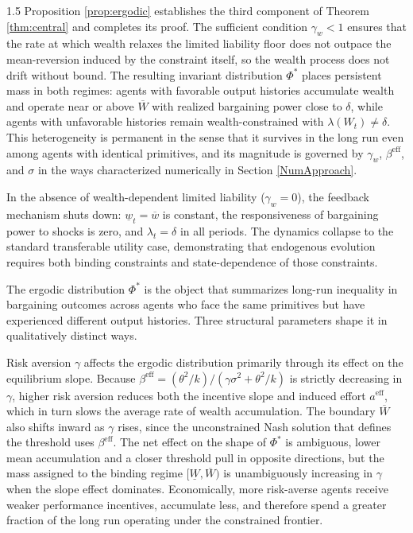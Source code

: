 \documentclass[12pt]{article}
\theoremstyle{definition}
\theoremstyle{plain}
\begin{document}
\begin{spacing}{1.5}
Proposition \ref{prop:ergodic} establishes the third component of Theorem \ref{thm:central} and completes its proof. The sufficient condition $\gamma_w < 1$ ensures that the rate at which wealth relaxes the limited liability floor does not outpace the mean-reversion induced by the constraint itself, so the wealth process does not drift without bound. The resulting invariant distribution $\Phi^*$ places persistent mass in both regimes: agents with favorable output histories accumulate wealth and operate near or above $\overline{W}$ with realized bargaining power close to $\delta$, while agents with unfavorable histories remain wealth-constrained with $\lambda(W_t) \neq \delta$. This heterogeneity is permanent in the sense that it survives in the long run even among agents with identical primitives, and its magnitude is governed by $\gamma_w$, $\beta^{\mathrm{eff}}$, and $\sigma$ in the ways characterized numerically in Section \ref{NumApproach}. 

In the absence of wealth-dependent limited liability ($\gamma_w = 0$), the feedback mechanism shuts down: $\underline{w}_t = \overline{w}$ is constant, the responsiveness of bargaining power to shocks is zero, and $\lambda_t = \delta$ in all periods. The dynamics collapse to the standard transferable utility case, demonstrating that endogenous evolution requires both binding constraints and state-dependence of those constraints.

The ergodic distribution $\Phi^*$ is the object that summarizes long-run inequality in bargaining outcomes across agents who face the same primitives but have experienced different output histories. Three structural parameters shape it in qualitatively distinct ways.
 
Risk aversion $\gamma$ affects the ergodic distribution primarily through its effect on the equilibrium slope. Because $\beta^{\mathrm{eff}} = (\theta^2/k)/(\gamma\sigma^2 + \theta^2/k)$ is strictly decreasing in $\gamma$, higher risk aversion reduces both the incentive slope and induced effort $a^{\mathrm{eff}}$, which in turn slows the average rate of wealth accumulation. The boundary $\overline{W}$ also shifts inward as $\gamma$ rises, since the unconstrained Nash solution that defines the threshold uses $\beta^{\mathrm{eff}}$. The net effect on the shape of $\Phi^*$ is ambiguous, lower mean accumulation and a closer threshold pull in opposite directions, but the mass assigned to the binding regime $[{\underline{W}}, \overline{W})$ is unambiguously increasing in $\gamma$ when the slope effect dominates. Economically, more risk-averse agents receive weaker performance incentives, accumulate less, and therefore spend a greater fraction of the long run operating under the constrained frontier.
 

\end{spacing}
\end{document}
